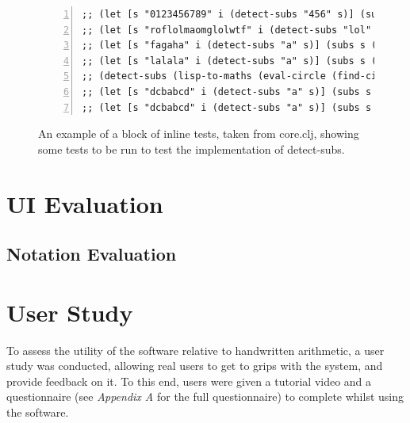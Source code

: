 \documentclass[12pt,twoside,notitlepage,xetex]{report}
\begin{document}
\begin{center}
\begin{figure}[H]
\begin{center}
\begin{minipage}{11.7cm}
\begin{Verbatim}[fontsize=\tiny,numbers=left]
;; (let [s "0123456789" i (detect-subs "456" s)] (subs s (:s (first i)) (:e (first i))))
;; (let [s "roflolmaomglolwtf" i (detect-subs "lol" s)] (subs s (:s (first i)) (:e (first i))))
;; (let [s "fagaha" i (detect-subs "a" s)] (subs s (:s (first i)) (:e (first i))))
;; (let [s "lalala" i (detect-subs "a" s)] (subs s (:s (first i)) (:e (first i))))
;; (detect-subs (lisp-to-maths (eval-circle (find-circle "c0"))) (lisp-to-maths (eval (:q (first @current-qset)))))
;; (let [s "dcbabcd" i (detect-subs "a" s)] (subs s (:s (first i)) (:e (first i))))
;; (let [s "dcbabcd" i (detect-subs "a" s)] (subs s (:s (nth i 1)) (:e (nth i 1))))

\end{Verbatim}
\end{minipage}
\end{center}
\caption{An example of a block of inline tests, taken from {\ttfamily core.clj}, showing some tests to be run to test the implementation of {\ttfamily detect-subs}.}
\end{figure}
\end{center}


\section{UI Evaluation}

\subsection{Notation Evaluation}

\section{User Study}

To assess the utility of the software relative to handwritten arithmetic, a user study was conducted, allowing real users to get to grips with the system, and provide feedback on it.  To this end, users were given a tutorial video and a questionnaire (see \emph{Appendix A} for the full questionnaire) to complete whilst using the software.
\end{document}

